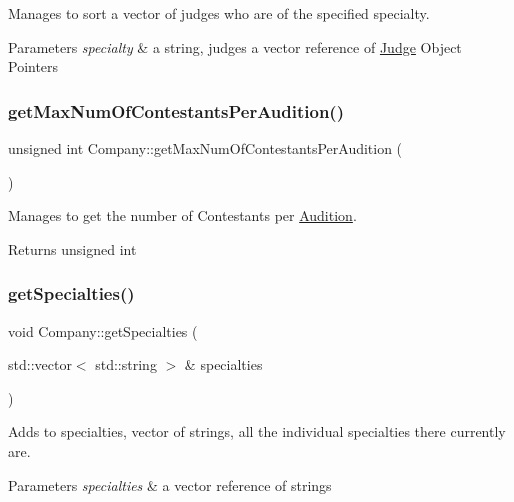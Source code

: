 Manages to sort a vector of judges who are of the specified specialty. 


\begin{DoxyParams}{Parameters}
{\em specialty} & a string, judges a vector reference of \hyperlink{class_judge}{Judge} Object Pointers \\
\hline
\end{DoxyParams}
\mbox{\label{class_company_a7631d2e0b84275b8f8cab27e3dad0473}} 
\subsubsection{\texorpdfstring{get\+Max\+Num\+Of\+Contestants\+Per\+Audition()}{getMaxNumOfContestantsPerAudition()}}
{\footnotesize\ttfamily unsigned int Company\+::get\+Max\+Num\+Of\+Contestants\+Per\+Audition (\begin{DoxyParamCaption}{ }\end{DoxyParamCaption})}



Manages to get the number of Contestants per \hyperlink{class_audition}{Audition}. 

\begin{DoxyReturn}{Returns}
unsigned int 
\end{DoxyReturn}
\mbox{\label{class_company_aab93a983bbd590e540b439033c9ec723}} 
\subsubsection{\texorpdfstring{get\+Specialties()}{getSpecialties()}}
{\footnotesize\ttfamily void Company\+::get\+Specialties (\begin{DoxyParamCaption}\item[{std\+::vector$<$ std\+::string $>$ \&}]{specialties }\end{DoxyParamCaption})}



Adds to specialties, vector of strings, all the individual specialties there currently are. 


\begin{DoxyParams}{Parameters}
{\em specialties} & a vector reference of strings \\
\hline
\end{DoxyParams}
\mbox{\label{class_company_a56268c11009ad2441a1dde545f7ceacf}} 
